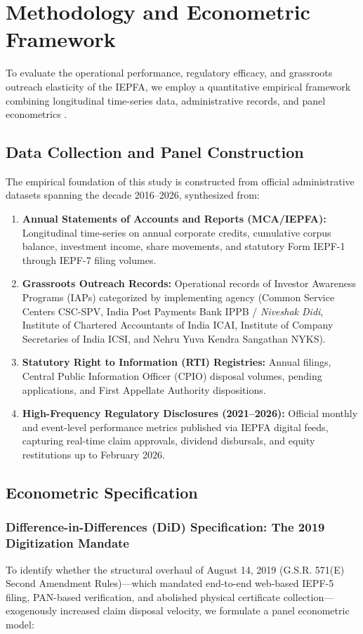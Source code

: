 \documentclass[openany]{book}
\begin{document}
\chapter{Methodology and Econometric Framework}

To evaluate the operational performance, regulatory efficacy, and grassroots outreach elasticity of the IEPFA, we employ a quantitative empirical framework combining longitudinal time-series data, administrative records, and panel econometrics \cite{wooldridge2010econometric, angrist2009mostly}.

\section{Data Collection and Panel Construction}
The empirical foundation of this study is constructed from official administrative datasets spanning the decade 2016--2026, synthesized from:
\begin{enumerate}
    \item \textbf{Annual Statements of Accounts and Reports (MCA/IEPFA):} Longitudinal time-series on annual corporate credits, cumulative corpus balance, investment income, share movements, and statutory Form IEPF-1 through IEPF-7 filing volumes.
    \item \textbf{Grassroots Outreach Records:} Operational records of Investor Awareness Programs (IAPs) categorized by implementing agency (Common Service Centers CSC-SPV, India Post Payments Bank IPPB / \textit{Niveshak Didi}, Institute of Chartered Accountants of India ICAI, Institute of Company Secretaries of India ICSI, and Nehru Yuva Kendra Sangathan NYKS).
    \item \textbf{Statutory Right to Information (RTI) Registries:} Annual filings, Central Public Information Officer (CPIO) disposal volumes, pending applications, and First Appellate Authority dispositions.
    \item \textbf{High-Frequency Regulatory Disclosures (2021--2026):} Official monthly and event-level performance metrics published via IEPFA digital feeds, capturing real-time claim approvals, dividend disbursals, and equity restitutions up to February 2026.
\end{enumerate}

\section{Econometric Specification}

\subsection{Difference-in-Differences (DiD) Specification: The 2019 Digitization Mandate}
To identify whether the structural overhaul of August 14, 2019 (G.S.R. 571(E) Second Amendment Rules)—which mandated end-to-end web-based IEPF-5 filing, PAN-based verification, and abolished physical certificate collection—exogenously increased claim disposal velocity, we formulate a panel econometric model:
\end{document}
